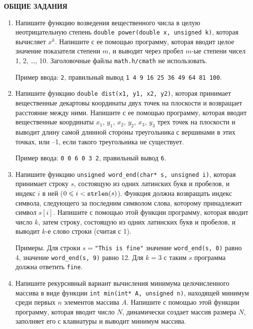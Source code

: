 \documentclass{article}
\newcommand{\textex}[1]{\texttt{\color{ForestGreen}#1}}
\begin{document}
\newpage
\begin{center}
\textbf{ОБЩИЕ ЗАДАНИЯ}
\end{center}

\sloppy
\begin{enumerate}
\item
Напишите функцию возведения вещественного числа в целую неотрицательную степень \texttt{double power(double x, unsigned k)}, которая вычисляет $x^k$. Напишите с ее помощью программу, которая вводит целое значение показателя степени $m$, и выводит через пробел $m$-ые степени чисел 1, 2, \ldots, 10. Заголовочные файлы \texttt{math.h/cmath} не использовать.

Пример ввода: \textex{2}, правильный вывод \textex{1 4 9 16 25 36 49 64 81 100}.

\item
Напишите функцию \texttt{double dist(x1, y1, x2, y2)}, которая принимает вещественные декартовы координаты двух точек на плоскости и возвращает расстояние между ними. Напишите с ее помощью программу, которая вводит вещественные координаты $x_1$, $y_1$, $x_2$, $y_2$, $x_3$, $y_3$ трех точек на плоскости и выводит длину самой длинной стороны треугольника с вершинами в этих точках, или –1, если такого треугольника не существует.

Пример ввода: \textex{0 0 6 0 3 2}, правильный вывод \textex{6}.

\item
Напишите функцию \texttt{unsigned word\_end(char* s, unsigned i)}, 
которая принимает строку $s$, состоящую из одних латинских букв и пробелов, и индекс $i$ в ней ($0 \leqslant i<\mbox{\texttt{strlen}}(s)$). Функция должна возвращать индекс символа, следующего за последним символом слова, которому принадлежит символ $s[i]$. Напишите с помощью этой функции программу, которая вводит число $k$, затем строку, состоящую из одних латинских букв и пробелов, и выводит $k$-е слово строки (считая с 1).

Примеры. Для строки $s={}$\verb!"!\texttt{This is fine"}
значение \texttt{word\_end(s, 0)}  равно 4,  значение \texttt{word\_end(s, 9)} равно 12.
Для $k=3$ с таким $s$ программа должна ответить \textex{fine}.

\item
Напишите рекурсивный вариант вычисления минимума целочисленного массива в виде функции \texttt{int min(int* A, unsigned n)}, находящей минимум среди первых $n$ элементов массива $A$. Напишите с помощью этой функции программу, которая вводит число $N$, динамически создает массив размера $N$, заполняет его с клавиатуры и выводит минимум массива.


\end{enumerate}
\end{document}
